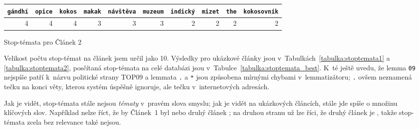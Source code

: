 \documentclass[12pt,a4paper]{report}
\begin{document}
{
    \begin{tabular}{ | r |r |r |r |r |r |r |r |r |r | }
        \hline
        \texttt{gándhí} & 
        \texttt{opice} & 
        \texttt{kokos} & 
        \texttt{makak} & 
        \texttt{návštěva} & 
        \texttt{muzeum} &
        \texttt{indický} &
        \texttt{mizet} & 
        \texttt{the} & 
        \texttt{kokosovník} \\ \hline
        
        
        4  & 4  & 4  & 3 & 3 & 3  & 2 & 2 & 2 & 2 \\ \hline
      \end{tabular}


}{Stop-témata pro Článek 2}





Velikost počtu stop-témat na článek jsem určil jako 10. Výsledky pro ukázkové články jsou v~Tabulkách~\ref{tabulka:stoptemata1} a \ref{tabulka:stoptemata2}, posčítaná stop-témata na celé databázi jsou v~Tabulce~\ref{tabulka:stoptemata_best}. K~té ještě uvedu, že lemma \texttt{09} nejspíše patří k~názvu politické strany TOP09 a lemmata \texttt{.} a \texttt{*} jsou způsobena mírnými chybami v~lemmatizátoru; \texttt{.} ovšem neznamená tečku na konci věty, kterou systém úspěšně ignoruje, ale tečku v~internetových adresách.

Jak je vidět, stop-témata stále nejsou \emph{tématy} v~pravém slova smyslu; jak je vidět na ukázkových článcích, stále jde spíše o množinu klíčových slov. Například nelze říct, že by Článek~1 byl  nebo druhý článek ; na druhou stranu už lze říci, že druhý článek je , takže stop-témata zcela bez relevance také nejsou.
\end{document}
